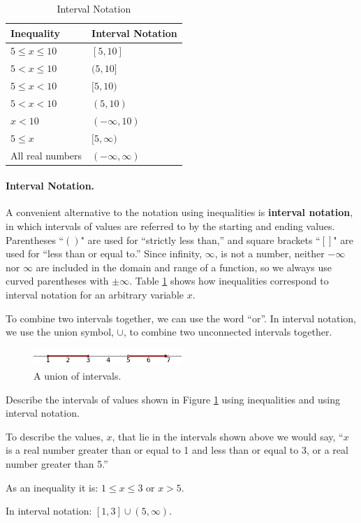 \begin{table}
    \centering
\begin{tabular}{ll}
\toprule
\textbf{Inequality} & \textbf{Interval Notation}\tabularnewline
\midrule
$5\le x \le 10$  & $[5, 10]$\\
$5 <  x \le 10$  & $(5, 10]$\\
$5\le x  <  10$  & $[5, 10)$\\
$5 <  x  <  10$  & $(5, 10)$\\
$x < 10$         & $(-\infty, 10)$\\
$5 \le x$        & $[5, \infty)$\\
All real numbers & $(-\infty, \infty)$ \\
\bottomrule
\end{tabular}
\caption{Interval Notation}
\label{tab:1-interval}
\end{table}
\paragraph{Interval Notation.} A convenient alternative to the notation using inequalities is \textbf{interval notation}, in which intervals of values are referred to by the starting and ending values. Parentheses ``$()$" are used for ``strictly less than,'' and square brackets ``$[]$" are used for ``less than or equal to.'' Since infinity, $\infty$, is not a number, neither $-\infty$ nor $\infty$ are included in the domain and range of a function, so we always use curved parentheses with $\pm\infty$. Table \ref{tab:1-interval} shows how inequalities correspond to interval notation for an arbitrary variable $x$.

To combine two intervals together, we can use the word ``or''. In interval notation, we use the
union symbol, $\cup$, to combine two unconnected intervals together.

\begin{figure}[ht!]
\centering
\includegraphics[width=0.5\textwidth]{img/chap1/sec1-2/ex-1-2-11.png}
\caption{A union of intervals.}
\label{fig:1211}
\end{figure}

\begin{example}
Describe the intervals of values shown in Figure \ref{fig:1211} using inequalities and using interval notation.

\solution To describe the values, $x$, that lie in the intervals shown above
we would say, ``$x$ is a real number greater than or equal to 1 and
less than or equal to 3, or a real number greater than 5.''

As an inequality it is: $1\le x\le 3$ or $x > 5$.

In interval notation: $[1, 3]\cup(5, \infty)$.
\end{example}

